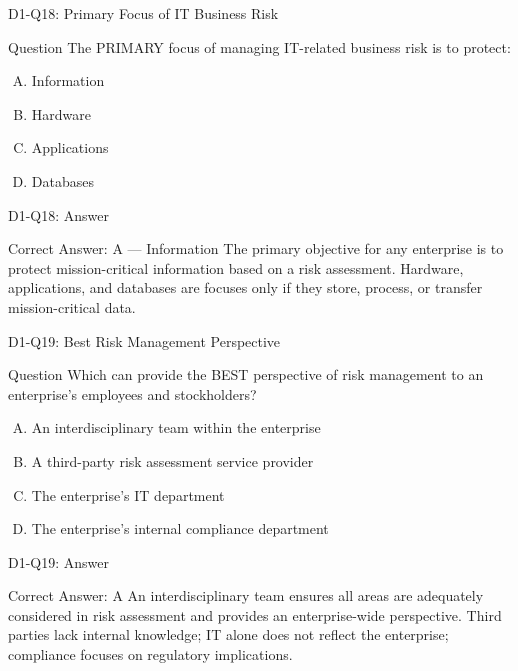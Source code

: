 \documentclass{beamer}
\begin{document}
	\begin{frame}{D1-Q18: Primary Focus of IT Business Risk}
		\begin{block}{Question}
			The PRIMARY focus of managing IT-related business risk is to protect:
		\end{block}
		\begin{enumerate}[(A)]
			\item Information
			\item Hardware
			\item Applications
			\item Databases
		\end{enumerate}
	\end{frame}
	\begin{frame}{D1-Q18: Answer}
		\begin{block}{Correct Answer: A --- Information}
			The primary objective for any enterprise is to protect mission-critical information based on a risk assessment. Hardware, applications, and databases are focuses only if they store, process, or transfer mission-critical data.
		\end{block}
	\end{frame}
	
	\begin{frame}{D1-Q19: Best Risk Management Perspective}
		\begin{block}{Question}
			Which can provide the BEST perspective of risk management to an enterprise's employees and stockholders?
		\end{block}
		\begin{enumerate}[(A)]
			\item An interdisciplinary team within the enterprise
			\item A third-party risk assessment service provider
			\item The enterprise's IT department
			\item The enterprise's internal compliance department
		\end{enumerate}
	\end{frame}
	\begin{frame}{D1-Q19: Answer}
		\begin{block}{Correct Answer: A}
			An interdisciplinary team ensures all areas are adequately considered in risk assessment and provides an enterprise-wide perspective. Third parties lack internal knowledge; IT alone does not reflect the enterprise; compliance focuses on regulatory implications.
		\end{block}
	\end{frame}
	
\end{document}
